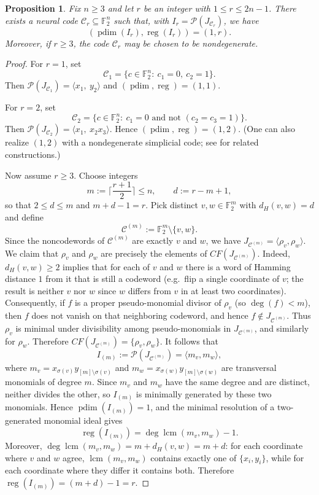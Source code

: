 \documentclass[12pt]{amsart}
\newtheorem{proposition}[theorem]{Proposition}
\theoremstyle{remark}
\theoremstyle{definition}
\DeclareMathOperator{\reg}{reg}
\DeclareMathOperator{\lcm}{lcm}
\DeclareMathOperator{\pd}{pdim}
\newcommand{\F}{\mathbb{F}}
\newcommand{\C}{\mathcal{C}}
\def\P{{\mathcal P}}
\begin{document}
\begin{proposition}\label{prop:pdim1-any-reg}
Fix $n\ge 3$ and let $r$ be an integer with $1\le r\le 2n-1$.
There exists a neural code $\C_r\subseteq\F_2^n$ such that, with
$I_r=\P(J_{\C_r})$, we have
\[
(\pd(I_r),\reg(I_r))=(1,r).
\]
Moreover, if $r\ge 3$, the code $\C_r$ may be chosen to be nondegenerate.
\end{proposition}

\begin{proof}
For $r=1$, 
set
\[
\C_1=\{c\in\F_2^n:\ c_1=0,\ c_2=1\}.
\]
Then $\P(J_{\C_1})=\langle x_1,\ y_2\rangle$ and  $(\pd,\reg)=(1,1)$.

For $r=2$, set
\[
\C_2=\{c\in\F_2^n:\ c_1=0 \text{ and not }(c_2=c_3=1)\}.
\]
Then $\P(J_{\C_2})=\langle x_1,\ x_2x_3\rangle$. Hence $(\pd,\reg)=(1,2)$.  (One can also realize $(1,2)$ with a nondegenerate simplicial code; see
 for related constructions.)

Now assume $r\ge 3$. Choose integers
\[
m:=\Big\lceil\frac{r+1}{2}\Big\rceil \le n,
\qquad
d:=r-m+1,
\]
so that $2\le d\le m$ and $m+d-1=r$. Pick distinct $v,w\in\F_2^m$ with $d_H(v,w)=d$ and define
\[
\C^{(m)}:=\F_2^m\setminus\{v,w\}.
\]
Since the noncodewords of $\C^{(m)}$ are exactly $v$ and $w$, we have
$J_{\C^{(m)}}=\langle \rho_v,\rho_w\rangle$.
We claim that $\rho_v$ and $\rho_w$ are precisely the elements of $CF(J_{\C^{(m)}})$.
Indeed, $d_H(v,w)\ge 2$ implies that for each of $v$ and $w$ there is a word of Hamming distance $1$
from it that is still a codeword (e.g.\ flip a single coordinate of $v$; the result is neither $v$ nor
$w$ since $w$ differs from $v$ in at least two coordinates).  Consequently, if $f$ is a proper
pseudo-monomial divisor of $\rho_v$ (so $\deg(f)<m$), then $f$ does not vanish on that neighboring
codeword, and hence $f\notin J_{\C^{(m)}}$.  Thus $\rho_v$ is minimal under divisibility among
pseudo-monomials in $J_{\C^{(m)}}$, and similarly for $\rho_w$.  Therefore $CF(J_{\C^{(m)}})=\{\rho_v,\rho_w\}$. It follows that
\[
I_{(m)}:=\P(J_{\C^{(m)}})=\langle m_v,m_w\rangle,
\]
where $m_v=x_{\sigma(v)}y_{[m]\setminus\sigma(v)}$ and
$m_w=x_{\sigma(w)}y_{[m]\setminus\sigma(w)}$ are transversal monomials of degree $m$.
Since $m_v$ and $m_w$ have the same degree and are distinct, neither divides the other, so $I_{(m)}$
is minimally generated by these two monomials.  Hence $\pd(I_{(m)})=1$, and the minimal resolution of a
two-generated monomial ideal gives
\[
\reg(I_{(m)})=\deg\lcm(m_v,m_w)-1.
\]
Moreover, $\deg\lcm(m_v,m_w)=m+d_H(v,w)=m+d$: for each coordinate where $v$ and $w$ agree,
$\lcm(m_v,m_w)$ contains exactly one of $\{x_i,y_i\}$, while for each coordinate where they differ it
contains both.  Therefore $\reg(I_{(m)})=(m+d)-1=r$.



\end{proof}
\end{document}
